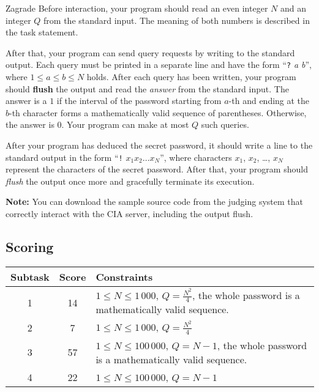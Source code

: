 \begin{statement}[
  problempoints=100,
  timelimit=3 seconds,
  memorylimit=512 MiB,
]{Zagrade}
Before interaction, your program should read an even integer $N$ and an integer
$Q$ from the standard input. The meaning of both numbers is described in the
task statement.

After that, your program can send query requests by writing to the standard
output. Each query must be printed in a separate line and have the
form ``\texttt{?} \textit{a b}'', where $1 \le a \le b \le N$ holds. After
each query has been written, your program should \textbf{flush} the output
and read the \textit{answer} from the standard input. The answer is a $1$ if
the interval of the password starting from $a$-th and ending at the $b$-th
character forms a mathematically valid sequence of parentheses. Otherwise,
the answer is $0$. Your program can make at most $Q$ such queries.

After your program has deduced the secret password, it should write a line to
the standard output in the form ``\texttt{!} \textit{$x_1x_2\dots x_N$}'', where
characters $x_1$, $x_2$, \dots, $x_N$ represent the characters of the secret
password. After that, your program should \textit{flush} the output once more
and gracefully terminate its execution.

\textbf{Note:} You can download the sample source code from the judging system
that correctly interact with the CIA server, including the output flush.

\subsection*{Scoring}
{\renewcommand{\arraystretch}{1.4}
  \setlength{\tabcolsep}{6pt}
  \begin{tabular}{ccl}
    Subtask & Score & Constraints \\ \midrule
    1 & 14 & $1 \le N \le 1\,000$, $Q = \frac{N^2}{4}$, the whole password is a
            mathematically valid sequence. \\
    2 & 7 & $1 \le N \le 1\,000$, $Q = \frac{N^2}{4}$ \\
    3 & 57 & $1 \le N \le 100\,000 $, $Q = N - 1$,
             the whole password is a mathematically valid sequence. \\
    4 & 22 & $1 \le N \le 100\,000 $, $Q = N - 1$ \\
\end{tabular}}


\end{statement}
